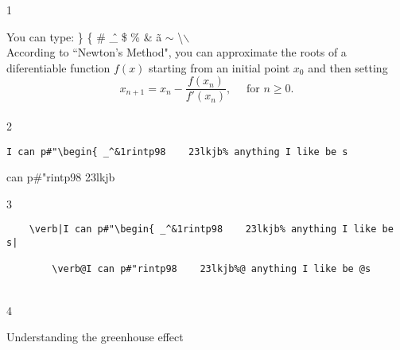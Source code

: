 \documentclass{article} %
\begin{document}
1

You can type: \} \{ \# \^ \_ \$ \% \& 
\~{a} $\sim$ \textbackslash $\backslash$\\

According to ``Newton's Method", you can approximate the roots 
of a diferentiable function $f(x)$ starting from an initial point $x_0$
and then setting
\[x_{n+1} = x_n - \frac{f(x_n)}{f'(x_n)},\quad\text{ for }n\ge0.\]\\

2




\verb|I can p#"\begin{ _^&1rintp98    23lkjb% anything I like be s|

\verb@I can p#"rintp98    23lkjb%@ anything I like be @s\\

3



\begin{verbatim}
	\verb|I can p#"\begin{ _^&1rintp98    23lkjb% anything I like be s|
		
		\verb@I can p#"rintp98    23lkjb%@ anything I like be @s
\end{verbatim}\\

4






\parindent=0mm %
\textsf{\large Understanding the greenhouse effect}
\end{document}
